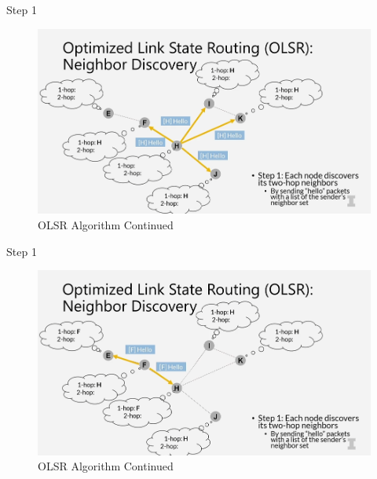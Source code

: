 \documentclass[11pt]{beamer}              %
\begin{document}
\begin{frame}{Step 1}

    \begin{figure}
        \centering
        \includegraphics[width=\textwidth]{figures/olsr2.png}
        \caption{OLSR Algorithm Continued \cite{coursera}}
    \end{figure}    
    
\end{frame}

\begin{frame}{Step 1}

    \begin{figure}
        \centering
        \includegraphics[width=\textwidth]{figures/olsr3.png}
        \caption{OLSR Algorithm Continued \cite{coursera}}
    \end{figure}    
    
\end{frame}
\end{document}
